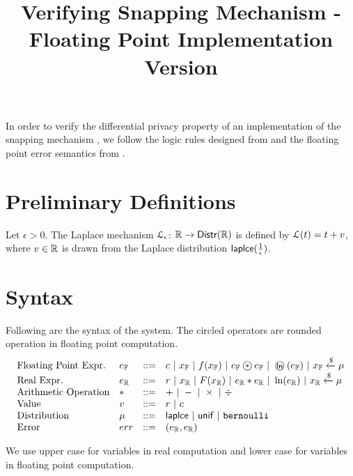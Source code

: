 \documentclass[a4paper,11pt]{article}
\begin{document}
\title{Verifying Snapping Mechanism - Floating Point Implementation Version}
\author{}

\date{}

\maketitle
In order to verify the differential privacy property of an implementation of the snapping mechanism \cite{mironov2012significance}, we follow the logic rules designed from \cite{barthe2016proving} and the floating point error semantics from \cite{Ramananandro2016unified,Martel2006higher,Becker2018verified,Moscato2017Automatic}.

\section{Preliminary Definitions}
\begin{defn}
Let $\epsilon > 0$. The Laplace mechanism  $\mathcal{L}_{\epsilon}$: $\mathbb{R} \to \mathsf{Distr}(\mathbb{R})$ is defined by $\mathcal{L}(t) = t + v$, where $v \in \mathbb{R}$ is drawn from the Laplace distribution $\mathsf{laplce}(\frac{1}{\epsilon})$.
\end{defn}
%
%
%
\section{Syntax}
Following are the syntax of the system. The circled operators are rounded operation in floating point computation.
\[\begin{array}{llll}
\mbox{Floating Point Expr.} & \fexpr & ::= & \fval
	~|~ \fvarx ~|~ f(\fvarx) ~|~ \fexpr \oop \fexpr
	~|~ \oln (\fexpr) ~|~ \fvarx \samplel \edistr \\
%
\mbox{Real Expr.} & \rexpr & ::= & \rval
	~|~ \rvarx ~|~ F(\rvarx) ~|~ \rexpr * \rexpr
	~|~ \ln (\rexpr) ~|~ \rvarx \samplel \edistr \\
%
\mbox{Arithmetic Operation} & * & ::= & + ~|~ - ~|~ \times ~|~ \div \\
%
\mbox{Value} & \valv & ::= & \rval ~|~  \fval \\
%
\mbox{Distribution} & \edistr & ::= & \laplace ~|~ \uniform ~|~ \bernoulli \\ 
%
\mbox{Error} & \err & ::= & (\rexpr, \rexpr) \\

\end{array}\]

We use upper case for variables in real computation and lower case for variables in floating point computation.
\end{document}
